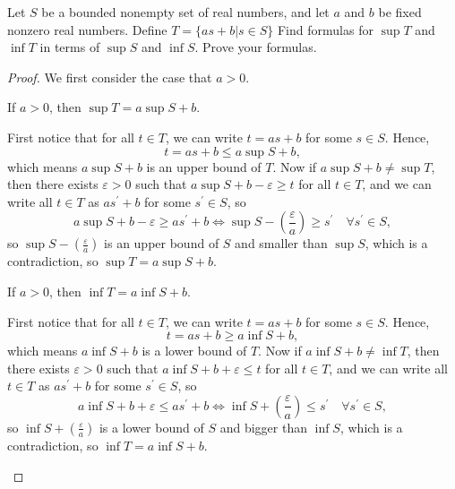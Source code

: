 
\begin{problem}[10 pts]  
Let $S$ be a bounded nonempty set of real numbers, and let $a$ and $b$
be fixed  nonzero real numbers. Define $T=\{as+b| s\in S\}$ Find formulas
for
$\sup T$ and $\inf T$ in terms of $\sup S$ and $\inf S$. Prove your
formulas.
\end{problem}
\begin{proof}
  We first consider the case that \(a > 0\). 
\begin{claim}
If \(a > 0\), then \(\sup T = a \sup S + b\). 
\end{claim}
\begin{explanation}
First notice that for all \(t \in T\), we can write \(t = as + b\) for some \(s \in S\). Hence, 
\[
  t = a s + b \le  a \sup S + b,
\]   
which means \(a \sup S + b\) is an upper bound of \(T\). Now if \(a \sup S + b \neq \sup T\), then there exists \(\varepsilon > 0\) such that \(a \sup S + b - \varepsilon \ge t\) for all \(t \in T\), and we can write all \(t \in T\) as \(a s^{\prime} + b\) for some \(s^{\prime} \in S\), so 
\[
  a \sup S + b - \varepsilon \ge a s^{\prime} + b \iff \sup S - \left( \frac{\varepsilon}{a} \right)  \ge s^{\prime} \quad \forall s^{\prime}  \in S,
\] so \(\sup S - \left( \frac{\varepsilon}{a} \right) \) is an upper bound of \(S\) and smaller than \(\sup S\), which is a contradiction, so \(\sup T = a \sup S + b\).    
\end{explanation}

\begin{claim}
  If \(a > 0\), then \(\inf T = a \inf S + b\).  
\end{claim}
\begin{explanation}
  First notice that for all \(t \in T\), we can write \(t = as + b\) for some \(s \in S\). Hence, 
\[
  t = a s + b \ge  a \inf S + b,
\]   
which means \(a \inf S + b\) is a lower bound of \(T\). Now if \(a \inf S + b \neq \inf T\), then there exists \(\varepsilon > 0\) such that \(a \inf S + b + \varepsilon \le t\) for all \(t \in T\), and we can write all \(t \in T\) as \(a s^{\prime} + b\) for some \(s^{\prime} \in S\), so 
\[
  a \inf S + b + \varepsilon \le a s^{\prime} + b \iff \inf S + \left( \frac{\varepsilon}{a} \right)  \le s^{\prime} \quad \forall s^{\prime}  \in S,
\] so \(\inf S + \left( \frac{\varepsilon}{a} \right) \) is a lower bound of \(S\) and bigger than \(\inf S\), which is a contradiction, so \(\inf T = a \inf S + b\).   
\end{explanation}


\end{proof}
